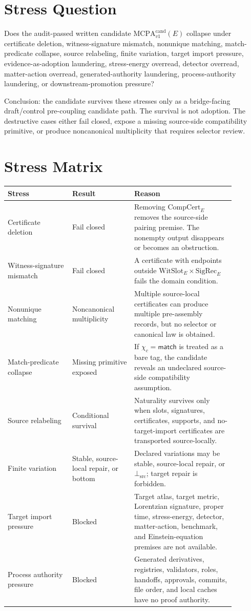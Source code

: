 \documentclass[11pt]{article}
\newcommand{\MCPACand}{\mathrm{MCPA}^{\mathrm{cand}}_{v1}}
\newcommand{\WitSlot}{\mathrm{WitSlot}}
\newcommand{\SigRec}{\mathrm{SigRec}}
\newcommand{\CompCert}{\mathrm{CompCert}}
\newcommand{\BottomSrc}{\bot_{\mathrm{src}}}
\begin{document}
\section{Stress Question}

Does the audit-passed written candidate \(\MCPACand(E)\) collapse under
certificate deletion, witness-signature mismatch, nonunique matching,
match-predicate collapse, source relabeling, finite variation, target import
pressure, evidence-as-adoption laundering, stress-energy overread, detector
overread, matter-action overread, generated-authority laundering,
process-authority laundering, or downstream-promotion pressure?

Conclusion: the candidate survives these stresses only as a bridge-facing
draft/control pre-coupling candidate path. The survival is not adoption. The
destructive cases either fail closed, expose a missing source-side
compatibility primitive, or produce noncanonical multiplicity that requires
selector review.

\section{Stress Matrix}

\begin{longtable}{p{0.25\linewidth}p{0.24\linewidth}p{0.39\linewidth}}
\toprule
Stress & Result & Reason \\
\midrule
Certificate deletion & Fail closed & Removing \(\CompCert_E\) removes the source-side pairing premise. The nonempty output disappears or becomes an obstruction. \\
Witness-signature mismatch & Fail closed & A certificate with endpoints outside \(\WitSlot_E\times\SigRec_E\) fails the domain condition. \\
Nonunique matching & Noncanonical multiplicity & Multiple source-local certificates can produce multiple pre-assembly records, but no selector or canonical law is obtained. \\
Match-predicate collapse & Missing primitive exposed & If \(\chi_c=\mathsf{match}\) is treated as a bare tag, the candidate reveals an undeclared source-side compatibility assumption. \\
Source relabeling & Conditional survival & Naturality survives only when slots, signatures, certificates, supports, and no-target-import certificates are transported source-locally. \\
Finite variation & Stable, source-local repair, or bottom & Declared variations may be stable, source-local repair, or \(\BottomSrc\); target repair is forbidden. \\
Target import pressure & Blocked & Target atlas, target metric, Lorentzian signature, proper time, stress-energy, detector, matter-action, benchmark, and Einstein-equation premises are not available. \\
Process authority pressure & Blocked & Generated derivatives, registries, validators, roles, handoffs, approvals, commits, file order, and local caches have no proof authority. \\
\bottomrule
\end{longtable}
\end{document}
